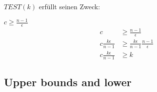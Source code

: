 \documentclass{beamer}
\begin{document}
\begin{frame}
   \frametitle{\insertsection}
   \framesubtitle{\insertsubsection}

   $TEST(k)$ erfüllt seinen Zweck:
   \begin{block}{$c\geq\frac{n-1}{\epsilon}$}
      \normalsize
      \begin{align*}
         c & \ge \frac{n-1}{\epsilon} \\
         c \frac{k\epsilon}{n-1} & \ge \frac{k\epsilon}{n-1}\frac{n-1}{\epsilon} \\
         c \frac{k\epsilon}{n-1} & \ge k
      \end{align*}
   \end{block}
\end{frame}

\begin{frame}
   \frametitle{\insertsection}
   \framesubtitle{\insertsubsection}
   \end{block}
\end{frame}

\subsection{Upper bounds and lower}
\end{document}
